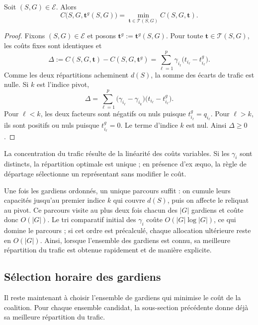 \begin{proposition}
\label{pro:opt}
Soit \((S,G)\in\mathcal E\). Alors
\[
C\bigl(S,G,\mathbf t^g(S,G)\bigr)
=\min_{\mathbf t\in\mathcal T(S,G)}C(S,G,\mathbf t).
\]
\end{proposition}

\begin{proof}
Fixons \((S,G)\in\mathcal E\) et posons
\(\mathbf t^g:=\mathbf t^g(S,G)\). Pour toute
\(\mathbf t\in\mathcal T(S,G)\), les coûts fixes sont identiques et
\[
\Delta
:=C(S,G,\mathbf t)-C(S,G,\mathbf t^g)
=\sum_{\ell=1}^{p}\gamma_{i_\ell}
\bigl(t_{i_\ell}-t_{i_\ell}^g\bigr).
\]
Comme les deux répartitions acheminent \(d(S)\), la somme des écarts de
trafic est nulle. Si \(k\) est l'indice pivot,
\[
\Delta
=\sum_{\ell=1}^{p}
\bigl(\gamma_{i_\ell}-\gamma_{i_k}\bigr)
\bigl(t_{i_\ell}-t_{i_\ell}^g\bigr).
\]
Pour \(\ell<k\), les deux facteurs sont négatifs ou nuls puisque
\(t_{i_\ell}^g=q_{i_\ell}\). Pour \(\ell>k\), ils sont positifs ou nuls
puisque \(t_{i_\ell}^g=0\). Le terme d'indice \(k\) est nul. Ainsi
\(\Delta\geqslant0\).
\end{proof}

La concentration du trafic résulte de la linéarité des coûts variables. Si
les \(\gamma_i\) sont distincts, la répartition optimale est unique ; en
présence d'ex æquo, la règle de départage sélectionne un représentant sans
modifier le coût.

Une fois les gardiens ordonnés, un unique parcours suffit : on cumule leurs
capacités jusqu'au premier indice \(k\) qui couvre \(d(S)\), puis on affecte
le reliquat au pivot. Ce parcours visite au plus deux fois chacun des
\(|G|\) gardiens et coûte donc \(O(|G|)\). Le tri comparatif initial des
\(\gamma_i\) coûte \(O(|G|\log|G|)\), ce qui domine le parcours ; si cet ordre
est précalculé, chaque allocation ultérieure reste en \(O(|G|)\). Ainsi,
lorsque l'ensemble des gardiens est connu, sa meilleure répartition du trafic est obtenue rapidement et de
manière explicite.


\subsection{Sélection horaire des gardiens}
\label{subsec:selection_gardiens}


Il reste maintenant à choisir l'ensemble de gardiens qui minimise le coût de
la coalition. Pour chaque ensemble candidat, la sous-section précédente donne
déjà sa meilleure répartition du trafic.

